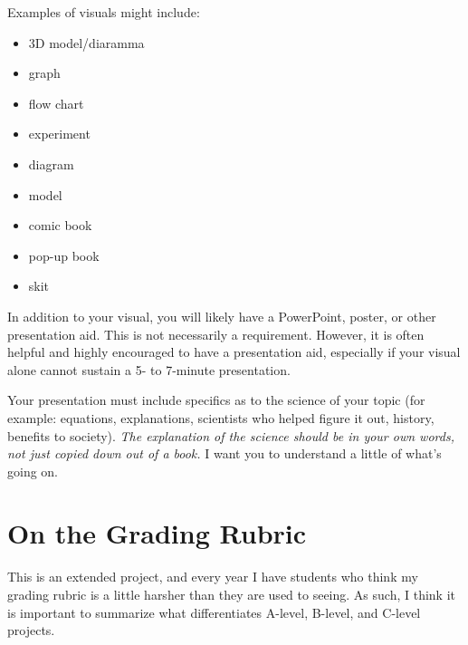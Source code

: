 \documentclass[11pt]{exam}
\begin{document}
Examples of visuals might include: 

\begin{multicols}{3}
  \begin{itemize}
    \item	3D model/diaramma
    \item	graph
    \item	flow chart
    \item	experiment
    \item	diagram
    \item	model
    \item	comic book
    \item pop-up book
    \item	skit
  \end{itemize}
\end{multicols}
 

In addition to your visual, you will likely have a PowerPoint, poster, or other presentation aid.  This is not necessarily a requirement.  However, it is often helpful and highly encouraged to have a presentation aid, especially if your visual alone cannot sustain a 5- to 7-minute presentation.  

Your presentation must include specifics as to the science of your topic (for example: equations, explanations, scientists who helped figure it out, history, benefits to society).  \emph{The explanation of the science should be in your own words, not just copied down out of a book.}  I want you to understand a little of what's going on.  

\pagebreak

\section*{On the Grading Rubric}
This is an extended project, and every year I have students who think my grading rubric is a little harsher than they are used to seeing.  As such, I think it is important to summarize what differentiates A-level, B-level, and C-level projects.
\end{document}
